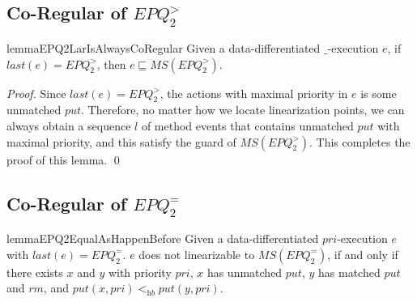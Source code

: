 \subsection{Co-Regular of $\textit{EPQ}_2^{>}$}
\label{subsec:appendix co-regular of EPQ2Lar}


\begin{restatable}{lemma}{EPQ2LarIsAlwaysCoRegular}
\label{lemma:EPQ2Lar is always co-regular}
Given a data-differentiated $\_$-execution $e$, if $\textit{last}(e) = \textit{EPQ}_2^{>}$, then $e \sqsubseteq \textit{MS}(\textit{EPQ}_2^{>})$.
\end{restatable}

\begin {proof}
Since $\textit{last}(e) = \textit{EPQ}_2^{>}$, the actions with maximal priority in $e$ is some unmatched $\textit{put}$. Therefore, no matter how we locate linearization points, we can always obtain a sequence $l$ of method events that contains unmatched $\textit{put}$ with maximal priority, and this satisfy the guard of $\textit{MS}(\textit{EPQ}_2^{>})$. This completes the proof of this lemma. \qed
\end {proof}




\subsection{Co-Regular of $\textit{EPQ}_2^{=}$}
\label{subsec:appendix co-regular of EPQ2Equal}

\begin{restatable}{lemma}{EPQ2EqualAsHappenBefore}
\label{lemma:EPQ2Equal as happen before}
Given a data-differentiated $\textit{pri}$-execution $e$ with $\textit{last}(e) = \textit{EPQ}_2^{=}$. $e$ does not linearizable to $\textit{MS}(\textit{EPQ}_2^{=})$, if and only if there exists $x$ and $y$ with priority $\textit{pri}$, $x$ has unmatched $\textit{put}$, $y$ has matched $\textit{put}$ and $\textit{rm}$, and $\textit{put}(x,\textit{pri}) <_{\textit{hb}} \textit{put}(y,\textit{pri})$.
\end{restatable}

